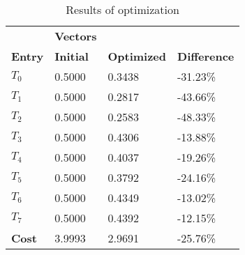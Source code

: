 \begin{table}[h!]
\centering
\begin{tabular}{llll}
\textbf{}      & \cellcolor[HTML]{EFEFEF}\textbf{Vectors} & \textbf{} & \textbf{}         \\
\rowcolor[HTML]{EFEFEF} 
\textbf{Entry} & \textbf{Initial} & \textbf{Optimized} & \textbf{Difference} \\
$T_0$ & 0.5000 & 0.3438 & -31.23\% \\ 
$T_1$ & 0.5000 & 0.2817 & -43.66\% \\ 
$T_2$ & 0.5000 & 0.2583 & -48.33\% \\ 
$T_3$ & 0.5000 & 0.4306 & -13.88\% \\ 
$T_4$ & 0.5000 & 0.4037 & -19.26\% \\ 
$T_5$ & 0.5000 & 0.3792 & -24.16\% \\ 
$T_6$ & 0.5000 & 0.4349 & -13.02\% \\ 
$T_7$ & 0.5000 & 0.4392 & -12.15\% \\ 
\rowcolor[HTML]{EFEFEF} 
\textbf{Cost}  & 3.9993 & 2.9691 & -25.76\% \\ 
\end{tabular}
\caption{Results of optimization}
\label{tab:OptimizationAnalysis}
\end{table}